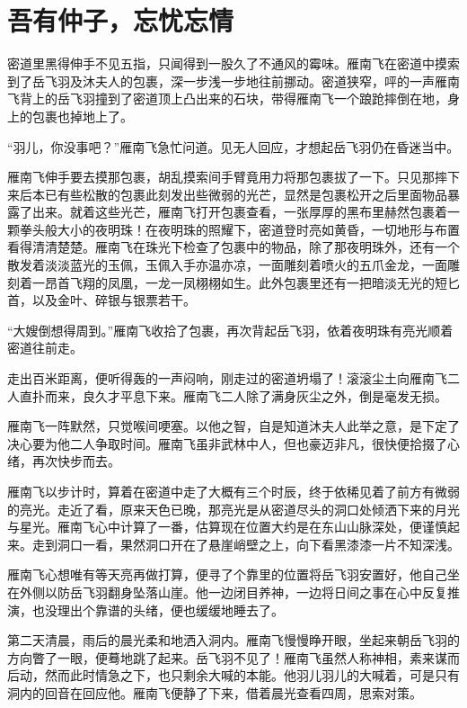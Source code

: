 
\chapter{吾有仲子，忘忧忘情}
\label{chap:wang-you-wang-qing}

密道里黑得伸手不见五指，只闻得到一股久了不通风的霉味。雁南飞在密道中摸索到了岳飞羽及沐夫人的包裹，深一步浅一步地往前挪动。密道狭窄，呯的一声雁南飞背上的岳飞羽撞到了密道顶上凸出来的石块，带得雁南飞一个踉跄摔倒在地，身上的包裹也掉地上了。

“羽儿，你没事吧？”雁南飞急忙问道。见无人回应，才想起岳飞羽仍在昏迷当中。

雁南飞伸手要去摸那包裹，胡乱摸索间手臂竟用力将那包裹拔了一下。只见那摔下来后本已有些松散的包裹此刻发出些微弱的光芒，显然是包裹松开之后里面物品暴露了出来。就着这些光芒，雁南飞打开包裹查看，一张厚厚的黑布里赫然包裹着一颗拳头般大小的夜明珠！在夜明珠的照耀下，密道登时亮如黄昏，一切地形与布置看得清清楚楚。雁南飞在珠光下检查了包裹中的物品，除了那夜明珠外，还有一个散发着淡淡蓝光的玉佩，玉佩入手亦温亦凉，一面雕刻着喷火的五爪金龙，一面雕刻着一昂首飞翔的凤凰，一龙一凤栩栩如生。此外包裹里还有一把暗淡无光的短匕首，以及金叶、碎银与银票若干。

“大嫂倒想得周到。”雁南飞收拾了包裹，再次背起岳飞羽，依着夜明珠有亮光顺着密道往前走。

走出百米距离，便听得轰的一声闷响，刚走过的密道坍塌了！滚滚尘土向雁南飞二人直扑而来，良久才平息下来。雁南飞二人除了满身灰尘之外，倒是毫发无损。

雁南飞一阵默然，只觉喉间哽塞。以他之智，自是知道沐夫人此举之意，是下定了决心要为他二人争取时间。雁南飞虽非武林中人，但也豪迈非凡，很快便拾掇了心绪，再次快步而去。

雁南飞以步计时，算着在密道中走了大概有三个时辰，终于依稀见着了前方有微弱的亮光。走近了看，原来天色已晚，那亮光是从密道尽头的洞口处倾洒下来的月光与星光。雁南飞心中计算了一番，估算现在位置大约是在东山山脉深处，便谨慎起来。走到洞口一看，果然洞口开在了悬崖峭壁之上，向下看黑漆漆一片不知深浅。

雁南飞心想唯有等天亮再做打算，便寻了个靠里的位置将岳飞羽安置好，他自己坐在外侧以防岳飞羽翻身坠落山崖。他一边闭目养神，一边将日间之事在心中反复推演，也没理出个靠谱的头绪，便也缓缓地睡去了。

第二天清晨，雨后的晨光柔和地洒入洞内。雁南飞慢慢睁开眼，坐起来朝岳飞羽的方向瞥了一眼，便蓦地跳了起来。岳飞羽不见了！雁南飞虽然人称神相，素来谋而后动，然而此时情急之下，也只剩余大喊的本能。他羽儿羽儿的大喊着，可是只有洞内的回音在回应他。雁南飞便静了下来，借着晨光查看四周，思索对策。

